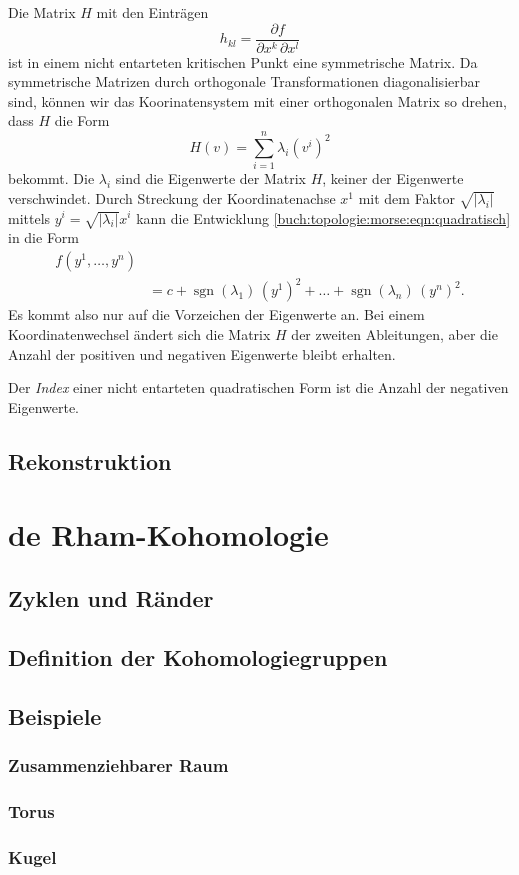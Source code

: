 Die Matrix $H$ mit den Einträgen
\[
h_{kl} = \frac{\partial f}{\partial x^k\,\partial x^l}
\]
ist in einem nicht entarteten kritischen Punkt eine symmetrische
Matrix.
Da symmetrische Matrizen durch orthogonale Transformationen
diagonalisierbar sind, können wir das Koorinatensystem mit
einer orthogonalen Matrix so drehen, dass $H$ die Form
\[
H(v)
=
\sum_{i=1}^n \lambda_i (v^i)^2
\]
bekommt.
Die $\lambda_i$ sind die Eigenwerte der Matrix $H$, keiner
der Eigenwerte verschwindet.
Durch Streckung der Koordinatenachse $x^1$ mit dem Faktor
$\!\sqrt{|\lambda_i|}$  mittels
$y^i = \!\sqrt{|\lambda_i|}x^i$ kann die Entwicklung
\eqref{buch:topologie:morse:eqn:quadratisch}
in die Form
\begin{align*}
f(y^1,\dots,y^n)
\\
&=
c
+
\operatorname{sgn}(\lambda_1)\,(y^1)^2
+
\dots
+
\operatorname{sgn}(\lambda_n)\,(y^n)^2.
\end{align*}
Es kommt also nur auf die Vorzeichen der Eigenwerte an.
Bei einem Koordinatenwechsel ändert sich die Matrix $H$ der zweiten
Ableitungen, aber die Anzahl der positiven und negativen Eigenwerte
bleibt erhalten.

\begin{definition}[Index]
%
Der \emph{Index} einer nicht entarteten quadratischen Form ist die
Anzahl der negativen Eigenwerte.
\end{definition}

%
%
\subsection{Rekonstruktion}

%
%
\section{de Rham-Kohomologie}

\subsection{Zyklen und Ränder}

\subsection{Definition der Kohomologiegruppen}

%
%
\subsection{Beispiele}

\subsubsection{Zusammenziehbarer Raum}

\subsubsection{Torus}

\subsubsection{Kugel}

